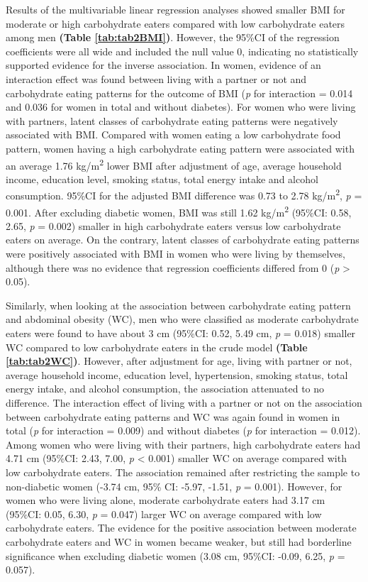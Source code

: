 

Results of the multivariable linear regression analyses showed smaller BMI for moderate or high carbohydrate eaters compared with low carbohydrate eaters among men \textbf{(Table \ref{tab:tab2BMI})}. However, the 95\%CI of the regression coefficients were all wide and included the null value 0, indicating no statistically supported evidence for the inverse association. In women, evidence of an interaction effect was found between living with a partner or not and carbohydrate eating patterns for the outcome of BMI (\textit{p} for interaction = 0.014 and 0.036 for women in total and without diabetes). For women who were living with partners, latent classes of carbohydrate eating patterns were negatively associated with BMI. Compared with women eating a low carbohydrate food pattern, women having a high carbohydrate eating pattern were associated with an average 1.76 kg/m\textsuperscript{2} lower BMI after adjustment of age, average household income, education level, smoking status, total energy intake and alcohol consumption. 95\%CI for the adjusted BMI difference was 0.73 to 2.78 kg/m\textsuperscript{2}, \textit{p} = 0.001. After excluding diabetic women, BMI was still 1.62 kg/m\textsuperscript{2} (95\%CI: 0.58, 2.65, \textit{p} = 0.002) smaller in high carbohydrate eaters versus low carbohydrate eaters on average. On the contrary, latent classes of carbohydrate eating patterns were positively associated with BMI in women who were living by themselves, although there was no evidence that regression coefficients differed from 0 (\textit{p} > 0.05).


Similarly, when looking at the association between carbohydrate eating pattern and abdominal obesity (WC), men who were classified as moderate carbohydrate eaters were found to have about 3 cm (95\%CI: 0.52, 5.49 cm, \textit{p} = 0.018) smaller WC compared to low carbohydrate eaters in the crude model \textbf{(Table \ref{tab:tab2WC})}. However, after adjustment for age, living with partner or not, average household income, education level, hypertension, smoking status, total energy intake, and alcohol consumption, the association attenuated to no difference. The interaction effect of living with a partner or not on the association between carbohydrate eating patterns and WC was again found in women in total (\textit{p} for interaction = 0.009) and without diabetes (\textit{p} for interaction = 0.012). Among women who were living with their partners, high carbohydrate eaters had 4.71 cm (95\%CI: 2.43, 7.00, \textit{p} < 0.001) smaller WC on average compared with low carbohydrate eaters. The association remained after restricting the sample to non-diabetic women (-3.74 cm, 95\% CI: -5.97, -1.51,  \textit{p} = 0.001). However, for women who were living alone, moderate carbohydrate eaters had 3.17 cm (95\%CI: 0.05, 6.30, \textit{p} = 0.047) larger WC on average compared with low carbohydrate eaters. The evidence for the positive association between moderate carbohydrate eaters and WC in women became weaker, but still had borderline significance when excluding diabetic women (3.08 cm, 95\%CI: -0.09, 6.25, \textit{p} = 0.057).
   


